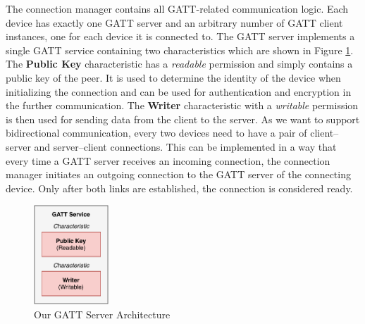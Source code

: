 The connection manager contains all GATT-related communication logic. Each device has exactly one GATT server and an arbitrary number of GATT client instances, one for each device it is connected to. The GATT server implements a single GATT service containing two characteristics which are shown in Figure \ref{gatt_server}. The \textbf{Public Key} characteristic has a \textit{readable} permission and simply contains a public key of the peer. It is used to determine the identity of the device when initializing the connection and can be used for authentication and encryption in the further communication. The \textbf{Writer} characteristic with a \textit{writable} permission is then used for sending data from the client to the server. As we want to support bidirectional communication, every two devices need to have a pair of client–server and server–client connections. This can be implemented in a way that every time a GATT server receives an incoming connection, the connection manager initiates an outgoing connection to the GATT server of the connecting device. Only after both links are established, the connection is considered ready.

\begin{figure}
    \centering
    \includegraphics[width=0.25\textwidth]{diagrams/ipv8-gatt}
    \caption{Our GATT Server Architecture}
    \label{gatt_server}
\end{figure}





